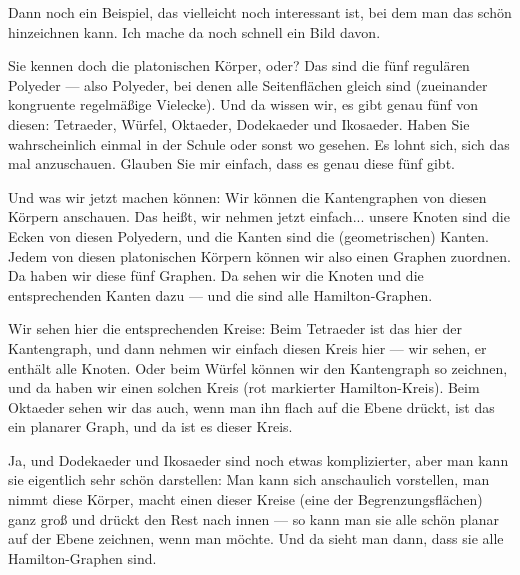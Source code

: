 \begin{spoken-clean}[00:35:22 - 00:36:46]
Dann noch ein Beispiel, das vielleicht noch interessant ist, bei dem man das schön hinzeichnen kann. Ich mache da noch schnell ein Bild davon. 

Sie kennen doch die platonischen Körper, oder? Das sind die fünf regulären Polyeder --- also Polyeder, bei denen alle Seitenflächen gleich sind (zueinander kongruente regelmäßige Vielecke). Und da wissen wir, es gibt genau fünf von diesen: Tetraeder, Würfel, Oktaeder, Dodekaeder und Ikosaeder. Haben Sie wahrscheinlich einmal in der Schule oder sonst wo gesehen. Es lohnt sich, sich das mal anzuschauen. Glauben Sie mir einfach, dass es genau diese fünf gibt.

Und was wir jetzt machen können: Wir können die Kantengraphen von diesen Körpern anschauen. Das heißt, wir nehmen jetzt einfach... unsere Knoten sind die Ecken von diesen Polyedern, und die Kanten sind die (geometrischen) Kanten. Jedem von diesen platonischen Körpern können wir also einen Graphen zuordnen. Da haben wir diese fünf Graphen. Da sehen wir die Knoten und die entsprechenden Kanten dazu --- und die sind alle Hamilton-Graphen.
\end{spoken-clean}

\begin{spoken-clean}[00:36:46 - 00:38:07]
Wir sehen hier die entsprechenden Kreise: Beim Tetraeder ist das hier der Kantengraph, und dann nehmen wir einfach diesen Kreis hier --- wir sehen, er enthält alle Knoten. Oder beim Würfel können wir den Kantengraph so zeichnen, und da haben wir einen solchen Kreis (rot markierter Hamilton-Kreis). Beim Oktaeder sehen wir das auch, wenn man ihn flach auf die Ebene drückt, ist das ein planarer Graph, und da ist es dieser Kreis.

Ja, und Dodekaeder und Ikosaeder sind noch etwas komplizierter, aber man kann sie eigentlich sehr schön darstellen: Man kann sich anschaulich vorstellen, man nimmt diese Körper, macht einen dieser Kreise (eine der Begrenzungsflächen) ganz groß und drückt den Rest nach innen --- so kann man sie alle schön planar auf der Ebene zeichnen, wenn man möchte. Und da sieht man dann, dass sie alle Hamilton-Graphen sind.
\end{spoken-clean}

